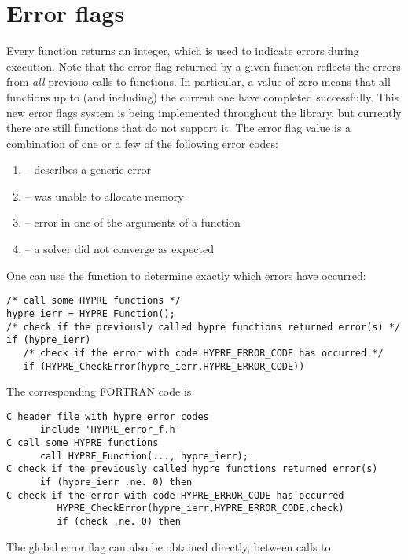 \section{Error flags}
Every \hypre{} function returns an integer, which is used to indicate errors
during execution.  Note that the error flag returned by a given function reflects
the errors from {\em all} previous calls to \hypre{} functions.  In particular, 
a value of zero means that all \hypre{} functions up to (and including) the 
current one have completed successfully.  This new error flags system is being
implemented throughout the library, but currently there are still functions that
do not support it.
The error flag value is a combination of one or a few of the following
error codes:
\begin{enumerate}
\item {} -- describes a generic error
\item {} -- \hypre{} was unable to allocate memory
\item {} -- error in one of the arguments of a \hypre{} function
\item {} -- a \hypre{} solver did not converge as expected
\end{enumerate}
One can use the  function to determine exactly
which errors have occurred:
\begin{display} \begin{verbatim}
/* call some HYPRE functions */
hypre_ierr = HYPRE_Function();
/* check if the previously called hypre functions returned error(s) */
if (hypre_ierr)
   /* check if the error with code HYPRE_ERROR_CODE has occurred */
   if (HYPRE_CheckError(hypre_ierr,HYPRE_ERROR_CODE))
\end{verbatim} \end{display}
The corresponding FORTRAN code is
\begin{display} \begin{verbatim}
C header file with hypre error codes
      include 'HYPRE_error_f.h'
C call some HYPRE functions
      call HYPRE_Function(..., hypre_ierr);
C check if the previously called hypre functions returned error(s)
      if (hypre_ierr .ne. 0) then
C check if the error with code HYPRE_ERROR_CODE has occurred
         HYPRE_CheckError(hypre_ierr,HYPRE_ERROR_CODE,check)
         if (check .ne. 0) then
\end{verbatim} \end{display}
The global error flag can also be obtained directly, between calls to
